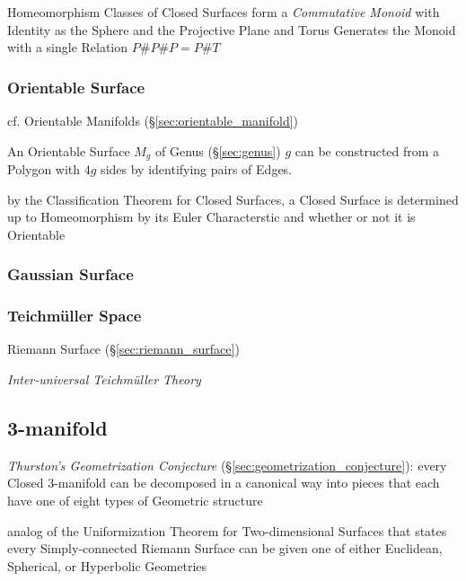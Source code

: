 Homeomorphism Classes of Closed Surfaces form a \emph{Commutative Monoid} with
Identity as the Sphere and the Projective Plane and Torus Generates the Monoid
with a single Relation $P \# P \# P = P \# T$



\subsubsection{Orientable Surface}\label{sec:orientable_surface}\hfill

cf. Orientable Manifolds (\S\ref{sec:orientable_manifold})

An Orientable Surface $M_g$ of Genus (\S\ref{sec:genus}) $g$ can
be constructed from a Polygon with $4g$ sides by identifying pairs of Edges.

by the Classification Theorem for Closed Surfaces, a Closed Surface is
determined up to Homeomorphism by its Euler Characterstic and whether or not it
is Orientable



\subsubsection{Gaussian Surface}\label{sec:gaussian_surface}\hfill

\subsubsection{Teichm\"uller Space}\label{sec:teichmuller_space}

Riemann Surface (\S\ref{sec:riemann_surface})

\emph{Inter-universal Teichm\"uller Theory} %



\subsection{3-manifold}\label{sec:three_manifold}

\emph{Thurston's Geometrization Conjecture}
(\S\ref{sec:geometrization_conjecture}): every Closed 3-manifold can be
decomposed in a canonical way into pieces that each have one of eight types of
Geometric structure

analog of the Uniformization Theorem for Two-dimensional Surfaces that states
every Simply-connected Riemann Surface can be given one of either Euclidean,
Spherical, or Hyperbolic Geometries



